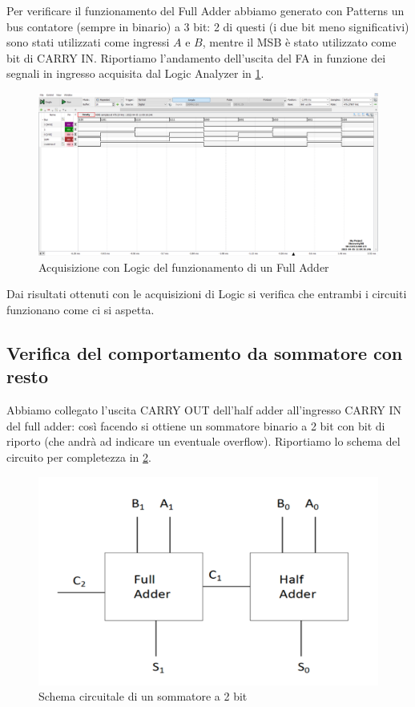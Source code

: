 \documentclass[10pt, a4paper, italian]{article}
\begin{document}
Per verificare il funzionamento del Full Adder abbiamo generato con Patterns
un bus contatore (sempre in binario) a 3 bit: 2 di questi (i due bit meno
significativi) sono stati utilizzati come ingressi $A$ e $B$, mentre il MSB è
stato utilizzato come bit di CARRY IN. Riportiamo l'andamento dell'uscita del
FA in funzione dei segnali in ingresso acquisita dal Logic Analyzer in
\cref{fig: FA_log}.
\begin{figure}[htbp]
	\centering
	\includegraphics[width=\textwidth]{full_time}
	\caption{Acquisizione con Logic del funzionamento di un Full Adder
	\label{fig: FA_log}}
\end{figure} 
Dai risultati ottenuti con le acquisizioni di Logic si verifica che entrambi
i circuiti funzionano come ci si aspetta.

\subsection{Verifica del comportamento da sommatore con resto}
Abbiamo collegato l'uscita CARRY OUT dell'half adder all'ingresso CARRY IN
del full adder: così facendo si ottiene un sommatore binario a 2 bit con bit
di riporto (che andrà ad indicare un eventuale overflow). Riportiamo lo schema
del circuito per completezza in \cref{fig: sommatore}.
\begin{figure}[htbp]
    \centering
    \includegraphics[width=0.6\linewidth]{sum}
    \caption{Schema circuitale di un sommatore a 2 bit}
    \label{fig: sommatore}
\end{figure}
\end{document}
